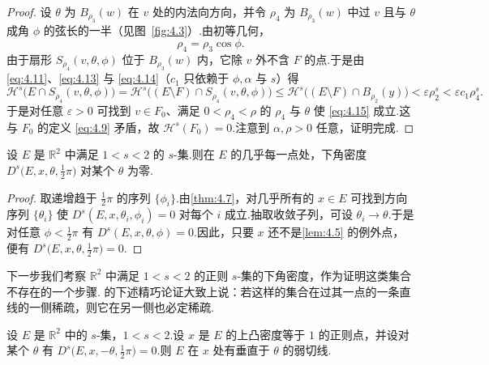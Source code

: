 \begin{proof}
设 $\theta$ 为 $B_{\rho_3}(w)$ 在 $v$ 处的内法向方向，并令 $\rho_4$ 为 $B_{\rho_3}(w)$ 中过 $v$ 且与 $\theta$ 成角 $\phi$ 的弦长的一半（见图~\ref{fig:4.3}）.由初等几何，
\begin{equation}\label{eq:4.14}
  \rho_4=\rho_3\cos\phi.
\end{equation}
由于扇形 $S_{\rho_4}(v,\theta,\phi)$ 位于 $B_{\rho_3}(w)$ 内，它除 $v$ 外不含 $F$ 的点.于是由 \eqref{eq:4.11}、\eqref{eq:4.13} 与 \eqref{eq:4.14}（$c_1$ 只依赖于 $\phi,\alpha$ 与 $s$）得
\begin{equation}\label{eq:4.15}
  \mathcal{H}^{s}\bigl(E\cap S_{\rho_4}(v,\theta,\phi)\bigr)
  =\mathcal{H}^{s}\bigl((E\setminus F)\cap S_{\rho_4}(v,\theta,\phi)\bigr)
  \leq\mathcal{H}^{s}\bigl((E\setminus F)\cap B_{\rho_2}(y)\bigr)
  <\varepsilon\rho_2^{s}
  <\varepsilon c_1\rho_4^{s}.
\end{equation}
于是对任意 $\varepsilon>0$ 可找到 $v\in F_0$、满足 $0<\rho_4<\rho$ 的 $\rho_4$ 与 $\theta$ 使 \eqref{eq:4.15} 成立.这与 $F_0$ 的定义 \eqref{eq:4.9} 矛盾，故 $\mathcal{H}^s(F_0)=0$.注意到 $\alpha,\rho>0$ 任意，证明完成.
\end{proof}

\begin{corollary}\label{cor:4.8}
设 $E$ 是 $\mathbb{R}^2$ 中满足 $1<s<2$ 的 $s$-集.则在 $E$ 的几乎每一点处，下角密度 $D^s\bigl(E,x,\theta,\frac{1}{2}\pi\bigr)$ 对某个 $\theta$ 为零.
\end{corollary}

\begin{proof}
取递增趋于 $\frac{1}{2}\pi$ 的序列 $\{\phi_i\}$.由\cref{thm:4.7}，对几乎所有的 $x\in E$ 可找到方向序列 $\{\theta_i\}$ 使 $D^s(E,x,\theta_i,\phi_i)=0$ 对每个 $i$ 成立.抽取收敛子列，可设 $\theta_i\to\theta$.于是对任意 $\phi<\frac{1}{2}\pi$ 有 $D^s(E,x,\theta,\phi)=0$.因此，只要 $x$ 还不是\cref{lem:4.5} 的例外点，便有 $D^s\bigl(E,x,\theta,\frac{1}{2}\pi\bigr)=0$.
\end{proof}

下一步我们考察 $\mathbb{R}^2$ 中满足 $1<s<2$ 的正则 $s$-集的下角密度，作为证明这类集合不存在的一个步骤.\textcite{marstrand1954a} 的下述精巧论证大致上说：若这样的集合在过其一点的一条直线的一侧稀疏，则它在另一侧也必定稀疏.

\begin{lemma}\label{lem:4.9}
设 $E$ 是 $\mathbb{R}^2$ 中的 $s$-集，$1<s<2$.设 $x$ 是 $E$ 的上凸密度等于 $1$ 的正则点，并设对某个 $\theta$ 有 $D^s\bigl(E,x,-\theta,\frac{1}{2}\pi\bigr)=0$.则 $E$ 在 $x$ 处有垂直于 $\theta$ 的弱切线.
\end{lemma}

